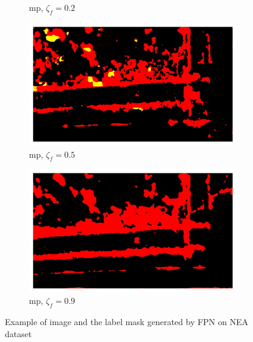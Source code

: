 \documentclass[mathematics,article,submit,pdftex,moreauthors]{Definitions/mdpi}
\begin{document}
\begin{figure}[!ht]
\begin{subfigure}[t]{.29\textwidth}
        \caption{\ac{mp}, $\zeta_f=0.2$}
        \label{fig:results:pruning:visualization:nea-fpn-mp-0.2}
      \end{subfigure}
      \begin{subfigure}[t]{.29\textwidth} 
        \centering
        \includegraphics[width=.95\linewidth]{figures/pruning-results/fpn_NEA_movement/10/mask_0.5.jpg}
        \caption{\ac{mp}, $\zeta_f=0.5$}
        \label{fig:results:pruning:visualization:nea-fpn-mp-0.5}
      \end{subfigure}
      \begin{subfigure}[t]{.29\textwidth} 
        \centering
        \includegraphics[width=.95\linewidth]{figures/pruning-results/fpn_NEA_movement/10/mask_0.9.jpg}
        \caption{\ac{mp}, $\zeta_f=0.9$}
        \label{fig:results:pruning:visualization:nea-fpn-mp-0.9}
      \end{subfigure}
      \caption{Example of image and the label mask generated by FPN on NEA dataset}
      \label{fig:results:pruning:visualization:nea}
  \end{figure}
\end{document}
